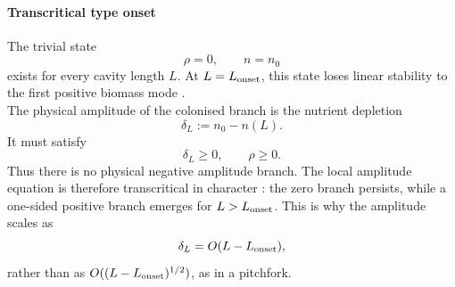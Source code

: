 \documentclass[11pt,a4paper]{report}
\begin{document}
	\paragraph{Transcritical type onset}
	The trivial state
	\[
	\rho=0,
	\qquad
	n= n_0
	\]
	exists for every cavity length $L$.  At $L=L_{\rm onset}$, this state
	loses linear stability to the first positive biomass mode \cite{dgl}.\\	
	The physical amplitude of the colonised branch is the nutrient depletion
	\[
	\delta_L:=n_0-n(L).
	\]
	It must satisfy
	\[
	\delta_L\ge0,
	\qquad
	\rho\ge0.
	\]
	Thus there is no physical negative amplitude branch. The local amplitude
	equation is therefore transcritical in character \cite{bifurcation}: the zero branch
	persists, while a one-sided positive branch emerges for
	$L>L_{\rm onset}$.  This is why the amplitude scales as
	\[
	\delta_L=O(L-L_{\rm onset}),
	\]
	rather than as $O((L-L_{\rm onset})^{1/2})$, as in a pitchfork.
\end{document}
